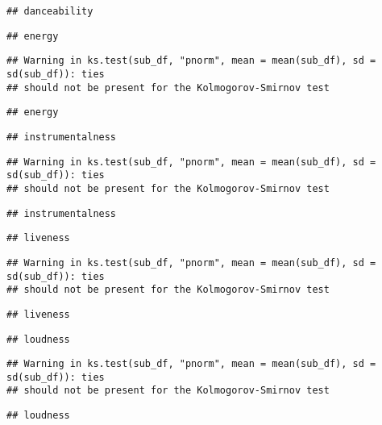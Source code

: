 \documentclass[
]{article}
\begin{document}
\begin{verbatim}
## danceability
\end{verbatim}

\begin{verbatim}
## energy
\end{verbatim}

\begin{verbatim}
## Warning in ks.test(sub_df, "pnorm", mean = mean(sub_df), sd = sd(sub_df)): ties
## should not be present for the Kolmogorov-Smirnov test
\end{verbatim}

\begin{verbatim}
## energy
\end{verbatim}

\begin{verbatim}
## instrumentalness
\end{verbatim}

\begin{verbatim}
## Warning in ks.test(sub_df, "pnorm", mean = mean(sub_df), sd = sd(sub_df)): ties
## should not be present for the Kolmogorov-Smirnov test
\end{verbatim}

\begin{verbatim}
## instrumentalness
\end{verbatim}

\begin{verbatim}
## liveness
\end{verbatim}

\begin{verbatim}
## Warning in ks.test(sub_df, "pnorm", mean = mean(sub_df), sd = sd(sub_df)): ties
## should not be present for the Kolmogorov-Smirnov test
\end{verbatim}

\begin{verbatim}
## liveness
\end{verbatim}

\begin{verbatim}
## loudness
\end{verbatim}

\begin{verbatim}
## Warning in ks.test(sub_df, "pnorm", mean = mean(sub_df), sd = sd(sub_df)): ties
## should not be present for the Kolmogorov-Smirnov test
\end{verbatim}

\begin{verbatim}
## loudness
\end{verbatim}
\end{document}
